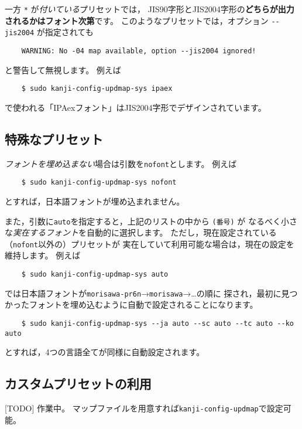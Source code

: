 \documentclass{jlreq}
\def\command#1{\texttt{#1}}
\def\option#1{\texttt{-{}-#1}}
\begin{document}
一方 \command{*} が\emph{付いている}プリセットでは，
JIS90字形とJIS2004字形の\textbf{どちらが出力されるかはフォント次第}です。
このようなプリセットでは，オプション \option{jis2004} が指定されても
\begin{verbatim}
    WARNING: No -04 map available, option --jis2004 ignored!
\end{verbatim}
と警告して無視します。
例えば
\begin{verbatim}
    $ sudo kanji-config-updmap-sys ipaex
\end{verbatim}
で使われる「IPAexフォント」はJIS2004字形でデザインされています。

\subsection{特殊なプリセット}\label{special-preset}

\emph{フォントを埋め込まない}場合は引数を\command{nofont}とします。
例えば
\begin{verbatim}
    $ sudo kanji-config-updmap-sys nofont
\end{verbatim}
とすれば，日本語フォントが埋め込まれません。

また，引数に\command{auto}を指定すると，上記のリストの中から \command{(番号)} が
なるべく小さな\emph{実在するフォント}を自動的に選択します。
ただし，現在設定されている（\command{nofont}以外の）プリセットが
実在していて利用可能な場合は，現在の設定を維持します。
例えば
\begin{verbatim}
    $ sudo kanji-config-updmap-sys auto
\end{verbatim}
では日本語フォントが\command{morisawa-pr6n}→\command{morisawa}→…の順に
探され，最初に見つかったフォントを埋め込むように自動で設定されることになります。
\begin{verbatim}
    $ sudo kanji-config-updmap-sys --ja auto --sc auto --tc auto --ko auto
\end{verbatim}
とすれば，4つの言語全てが同様に自動設定されます。

\subsection{カスタムプリセットの利用}

[TODO] 作業中。
マップファイルを用意すれば\command{kanji-config-updmap}で設定可能。
\end{document}
